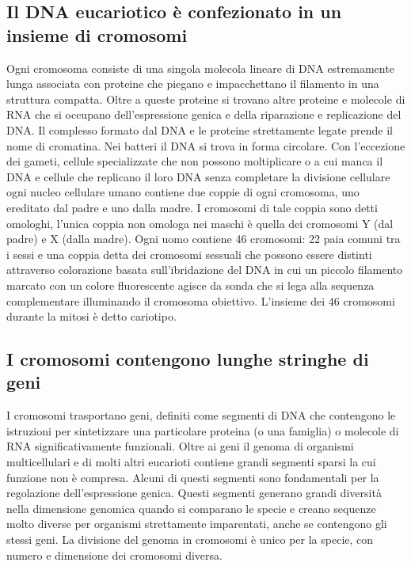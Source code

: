 \subsection{Il DNA eucariotico \`e confezionato in un insieme di cromosomi}
Ogni cromosoma consiste di una singola molecola lineare di DNA estremamente lunga associata con proteine che piegano e impacchettano il filamento in una struttura compatta. Oltre a 
queste proteine si trovano altre proteine e molecole di RNA che si occupano dell'espressione genica e della riparazione e replicazione del DNA. Il complesso formato dal DNA e le proteine
strettamente legate prende il nome di cromatina. Nei batteri il DNA si trova in forma circolare. Con l'eccezione dei gameti, cellule specializzate che non possono
moltiplicare o a cui manca il DNA e cellule che replicano il loro DNA senza completare la divisione cellulare ogni nucleo cellulare umano contiene due coppie di ogni cromosoma, uno 
ereditato dal padre e uno dalla madre. I cromosomi di tale coppia sono detti omologhi, l'unica coppia non omologa nei maschi \`e quella dei cromosomi Y (dal padre) e X (dalla madre).
Ogni uomo contiene 46 cromosomi: 22 paia comuni tra i sessi e una coppia detta dei cromosomi sessuali che possono essere distinti attraverso colorazione basata sull'ibridazione del DNA
in cui un piccolo filamento marcato con un colore fluorescente agisce da sonda che si lega alla sequenza complementare illuminando il cromosoma obiettivo. L'insieme dei 46 cromosomi
durante la mitosi \`e detto cariotipo.
\subsection{I cromosomi contengono lunghe stringhe di geni}
I cromosomi trasportano geni, definiti come segmenti di DNA che contengono le istruzioni per sintetizzare una particolare proteina (o una famiglia) o molecole di RNA significativamente 
funzionali. Oltre ai geni il genoma di organismi multicellulari e di molti altri eucarioti contiene grandi segmenti sparsi la cui funzione non \`e compresa. Alcuni di questi segmenti
sono fondamentali per la regolazione dell'espressione genica. Questi segmenti generano grandi diversit\`a nella dimensione genomica quando si comparano le specie e creano sequenze molto
diverse per organismi strettamente imparentati, anche se contengono gli stessi geni. La divisione del genoma in cromosomi \`e unico per la specie, con numero e dimensione dei cromosomi
diversa. 
